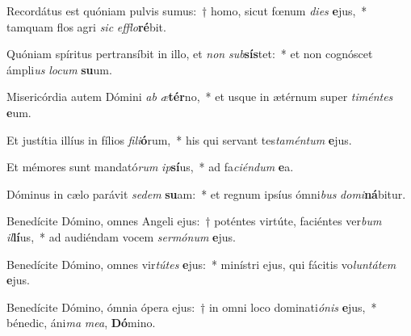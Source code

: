 \item Recordátus est quóniam pulvis sumus:~† homo, sicut fœnum \textit{di}\textit{es} \textbf{e}jus,~* tamquam flos agri \textit{sic} \textit{ef}\textit{flo}\textbf{ré}bit.
\item Quóniam spíritus pertransíbit in illo, et \textit{non} \textit{sub}\textbf{sís}tet:~* et non cognóscet ámpli\textit{us} \textit{lo}\textit{cum} \textbf{su}um.
\item Misericórdia autem Dómini \textit{ab} \textit{æ}\textbf{tér}no,~* et usque in ætérnum super \textit{ti}\textit{mén}\textit{tes} \textbf{e}um.
\item Et justítia illíus in fílios \textit{fi}\textit{li}\textbf{ó}rum,~* his qui servant tes\textit{ta}\textit{mén}\textit{tum} \textbf{e}jus.
\item Et mémores sunt mandató\textit{rum} \textit{ip}\textbf{sí}us,~* ad fa\textit{ci}\textit{én}\textit{dum} \textbf{e}a.
\item Dóminus in cælo parávit \textit{se}\textit{dem} \textbf{su}am:~* et regnum ipsíus ómni\textit{bus} \textit{do}\textit{mi}\textbf{ná}bitur.
\item Benedícite Dómino, omnes Angeli ejus:~† poténtes virtúte, faciéntes ver\textit{bum} \textit{il}\textbf{lí}us,~* ad audiéndam vocem \textit{ser}\textit{mó}\textit{num} \textbf{e}jus.
\item Benedícite Dómino, omnes vir\textit{tú}\textit{tes} \textbf{e}jus:~* minístri ejus, qui fácitis vo\textit{lun}\textit{tá}\textit{tem} \textbf{e}jus.
\item Benedícite Dómino, ómnia ópera ejus:~† in omni loco dominati\textit{ó}\textit{nis} \textbf{e}jus,~* bénedic, áni\textit{ma} \textit{me}\textit{a}, \textbf{Dó}mino.
